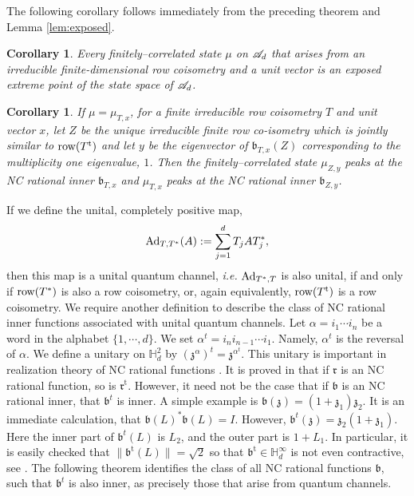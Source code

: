 \documentclass{article}
\newtheorem{cor}[thm]{Corollary}
\theoremstyle{definition}
\theoremstyle{remark}
\numberwithin{equation}{section}
\newcommand{\mr}{\ensuremath{\mathrm}}
\newcommand{\scr}{\ensuremath{\mathscr}}
\def\fr{\mathfrak{r}}
\def\frt{\mathfrak{r} ^\mathrm{t}}
\def\fb{\mathfrak{b}}
\def\fbt{\mathfrak{b} ^{\mathrm{t}}}
\def\bH{\mathbb{H}}
\def\mrt{\mathrm{t}}
\def\mult{\mathbb{H} ^\infty _d}
\begin{document}
The following corollary follows immediately from the preceding theorem and Lemma \ref{lem:exposed}.

\begin{cor}
Every finitely--correlated state $\mu$ on $\scr{A}_d$ that arises from an irreducible finite-dimensional row coisometry and a unit vector is an exposed extreme point of the state space of $\scr{A}_d$.

\end{cor}

\begin{cor}
If $\mu = \mu _{T,x}$, for a finite irreducible row coisometry $T$ and unit vector $x$, let $Z$ be the unique irreducible finite row co-isometry which is jointly similar to $\mr{row} (T ^\mrt )$ and let $y$ be the eigenvector of $\fb _{T,x} (Z)$ corresponding to the multiplicity one eigenvalue, $1$. Then the finitely--correlated state $\mu _{Z,y}$ peaks at the NC rational inner $\fb _{T,x}$ and $\mu _{T,x}$ peaks at the NC rational inner $\fb _{Z,y}$.
\end{cor}

If we define the unital, completely positive map,
$$ \mr{Ad} _{T,T^*} (A) := \sum _{j=1} ^d T_j A T_j ^*, $$ then this map is a unital quantum channel, \emph{i.e.} $\mr{Ad} _{T^* , T}$ is also unital, if and only if $\mr{row} (T ^*)$ is also a row coisometry, or, again equivalently, $\mr{row} (T^\mrt)$ is a row coisometry. We require another definition to describe the class of NC rational inner functions associated with unital quantum channels. Let $\alpha = i_1 \cdots i_n$ be a word in the alphabet $\{1,\cdots,d\}$. We set $\alpha^t = i_n i_{n-1} \cdots i_1$. Namely, $\alpha^t$ is the reversal of $\alpha$. We define a unitary on $\bH^2_d$ by $(\mathfrak{z}^{\alpha})^t = \mathfrak{z}^{\alpha^t}$. This unitary is important in realization theory of NC rational functions \cite{JMS-NCrat}. It is proved in \cite[Lemma 2.2]{JMS-ncratClark} that if $\fr$ is an NC rational function, so is $\frt$. However, it need not be the case that if $\fb$ is an NC rational inner, that $\fb^t$ is inner. A simple example is $\fb(\mathfrak{z}) = (1 + \mathfrak{z_1})\mathfrak{z_2}$. It is an immediate calculation, that $\fb(L)^* \fb(L) = I$. However, $\fb^t(\mathfrak{z}) = \mathfrak{z_2}(1 + \mathfrak{z_1})$. Here the inner part of $\fb^t(L)$ is $L_2$, and the outer part is $1 + L_1$. In particular, it is easily checked that $\| \fbt (L) \| = \sqrt{2}$ so that $\fbt \in \mult$ is not even contractive, see \cite[Example 3.4]{JM-ncld}.  The following theorem identifies the class of all NC rational functions $\fb$, such that $\fb^t$ is also inner, as precisely those that arise from quantum channels.
\end{document}

